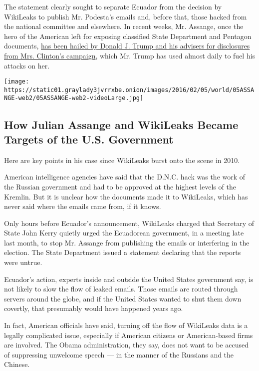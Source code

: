 The statement clearly sought to separate Ecuador from the decision by
WikiLeaks to publish Mr. Podesta's emails and, before that, those hacked
from the national committee and elsewhere. In recent weeks, Mr. Assange,
once the hero of the American left for exposing classified State
Department and Pentagon documents,
\href{http://www.nytimes3xbfgragh.onion/2016/10/13/us/politics/wikileaks-hillary-clinton-emails.html}{has
been hailed by Donald J. Trump and his advisers for disclosures from
Mrs. Clinton's campaign}, which Mr. Trump has used almost daily to fuel
his attacks on her.

\href{https://www.nytimes3xbfgragh.onion/interactive/2019/world/julian-assange-wikileaks.html}{}

\texttt{[image: https://static01.graylady3jvrrxbe.onion/images/2016/02/05/world/05ASSANGE-web2/05ASSANGE-web2-videoLarge.jpg]}

\hypertarget{how-julian-assange-and-wikileaks-became-targets-of-the-us-government}{%
\subsection{How Julian Assange and WikiLeaks Became Targets of the U.S.
Government}\label{how-julian-assange-and-wikileaks-became-targets-of-the-us-government}}

Here are key points in his case since WikiLeaks burst onto the scene in
2010.

American intelligence agencies have said that the D.N.C. hack was the
work of the Russian government and had to be approved at the highest
levels of the Kremlin. But it is unclear how the documents made it to
WikiLeaks, which has never said where the emails came from, if it knows.

Only hours before Ecuador's announcement, WikiLeaks charged that
Secretary of State John Kerry quietly urged the Ecuadorean government,
in a meeting late last month, to stop Mr. Assange from publishing the
emails or interfering in the election. The State Department issued a
statement declaring that the reports were untrue.

Ecuador's action, experts inside and outside the United States
government say, is not likely to slow the flow of leaked emails. Those
emails are routed through servers around the globe, and if the United
States wanted to shut them down covertly, that presumably would have
happened years ago.

In fact, American officials have said, turning off the flow of WikiLeaks
data is a legally complicated issue, especially if American citizens or
American-based firms are involved. The Obama administration, they say,
does not want to be accused of suppressing unwelcome speech --- in the
manner of the Russians and the Chinese.

